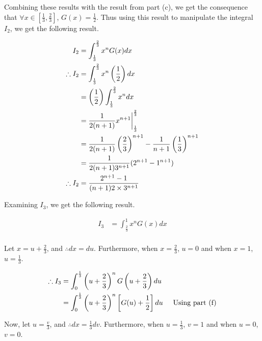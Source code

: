 \documentclass[a4paper]{article}
\begin{document}
\begin{enumerate}[label=\textbf{\arabic*.}]
\begin{enumerate}
		\pagebreak

		Combining these results with the result from part (c), we get the consequence that $\forall x \in \left[\frac{1}{3},\frac{2}{3}\right]$, $G(x) = \frac{1}{2}$. Thus using this result to manipulate the integral $I_2$, we get the following result.

		\begin{align*}
		I_2 & = \int_{\frac{1}{3}}^{\frac{2}{3}}x^{n}G(x)dx\\
		\therefore I_2 & = \int_{\frac{1}{3}}^{\frac{2}{3}}x^{n}\left(\frac{1}{2}\right)dx\\
		& = \left(\frac{1}{2}\right)\int_{\frac{1}{3}}^{\frac{2}{3}}x^{n}dx\\
		& = \frac{1}{2(n+1)}x^{n+1} \bigg{|}_{\frac{1}{3}}^{\frac{2}{3}}\\
		& = \frac{1}{2(n+1)}\left(\frac{2}{3}\right)^{n+1} - \frac{1}{n+1}\left(\frac{1}{3}\right)^{n+1}\\
		& = \frac{1}{2(n+1)3^{n+1}}(2^{n+1}-1^{n+1})\\
		\therefore I_2 & = \frac{2^{n+1}-1}{(n+1)2\times3^{n+1}}\\
		\end{align*}

		Examining $I_3$, we get the following result.

		\begin{align*}
		I_3 & = \int_{\frac{2}{3}}^{1}x^{n}G(x)dx\\
		\end{align*}

		Let $x = u + \frac{2}{3}$, and $\therefore dx = du$. Furthermore, when $x = \frac{2}{3}$, $u = 0$ and when $x = 1$, $u = \frac{1}{3}$. 

		\begin{align*}
		\therefore I_3 & = \int_{0}^{\frac{1}{3}}\left(u + \frac{2}{3}\right)^{n}G\left(u + \frac{2}{3}\right)du\\
		& = \int_{0}^{\frac{1}{3}}\left(u + \frac{2}{3}\right)^{n}\left[G(u) + \frac{1}{2}\right]du \hspace{5mm} \text{Using part (f)}\\
		\end{align*}

		\pagebreak

		Now, let $u = \frac{v}{3}$, and $\therefore dx = \frac{1}{3}dv$. Furthermore, when $u = \frac{1}{3}$, $v = 1$ and when $u = 0$, $v = 0$.


\end{enumerate}
\end{enumerate}
\end{document}
